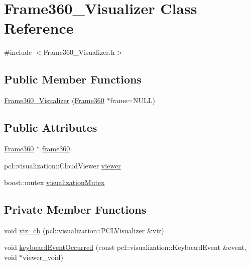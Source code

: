 \hypertarget{classFrame360__Visualizer}{\section{Frame360\-\_\-\-Visualizer Class Reference}
\label{classFrame360__Visualizer}
}


{\ttfamily \#include $<$Frame360\-\_\-\-Visualizer.\-h$>$}

\subsection*{Public Member Functions}
\begin{DoxyCompactItemize}
\item 
\hyperlink{classFrame360__Visualizer_ab2313f77f53843ee07ec3550e47df6e5}{Frame360\-\_\-\-Visualizer} (\hyperlink{classFrame360}{Frame360} $\ast$frame=N\-U\-L\-L)
\end{DoxyCompactItemize}
\subsection*{Public Attributes}
\begin{DoxyCompactItemize}
\item 
\hyperlink{classFrame360}{Frame360} $\ast$ \hyperlink{classFrame360__Visualizer_a44e5734ed91fe3a08034fe6f6d204ed8}{frame360}
\item 
pcl\-::visualization\-::\-Cloud\-Viewer \hyperlink{classFrame360__Visualizer_a0fa4172237791194dce989b0d88eb1b6}{viewer}
\item 
boost\-::mutex \hyperlink{classFrame360__Visualizer_a5564c53caafff23f97fc6bb91bca058d}{visualization\-Mutex}
\end{DoxyCompactItemize}
\subsection*{Private Member Functions}
\begin{DoxyCompactItemize}
\item 
void \hyperlink{classFrame360__Visualizer_a736f8a2d9f4033ef110658eab9caba8a}{viz\-\_\-cb} (pcl\-::visualization\-::\-P\-C\-L\-Visualizer \&viz)
\item 
void \hyperlink{classFrame360__Visualizer_ab70afbc727460545de56537e40437c2b}{keyboard\-Event\-Occurred} (const pcl\-::visualization\-::\-Keyboard\-Event \&event, void $\ast$viewer\-\_\-void)
\end{DoxyCompactItemize}
